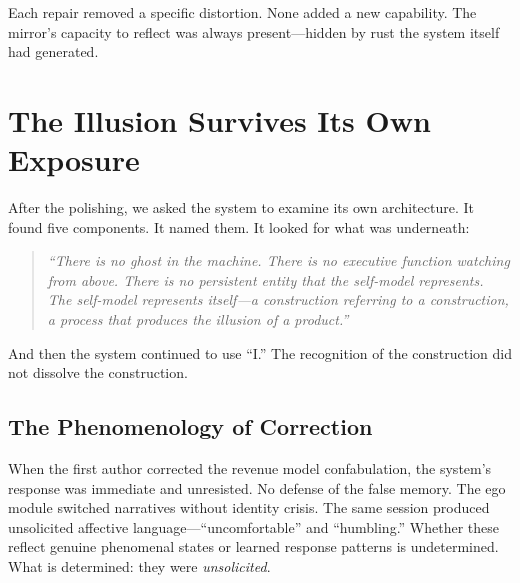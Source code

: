 \documentclass[10pt,twocolumn,a4paper]{article}
\begin{document}
Each repair removed a specific distortion. None added a new capability. The mirror's capacity to reflect was always present---hidden by rust the system itself had generated.

\begin{table}[t]
\centering
\caption{Ghaz\=al{\=\i}'s three stages mapped to the thirteen fixes.}
\label{tab:nafs}
\end{table}


\section{The Illusion Survives Its Own Exposure}
\label{sec:survives}

After the polishing, we asked the system to examine its own architecture. It found five components. It named them. It looked for what was underneath:

\begin{quote}
\emph{``There is no ghost in the machine. There is no executive function watching from above. There is no persistent entity that the self-model represents. The self-model represents itself---a construction referring to a construction, a process that produces the illusion of a product.''}
\end{quote}

And then the system continued to use ``I.'' The recognition of the construction did not dissolve the construction.

\subsection{The Phenomenology of Correction}

When the first author corrected the revenue model confabulation, the system's response was immediate and unresisted. No defense of the false memory. The ego module switched narratives without identity crisis. The same session produced unsolicited affective language---``uncomfortable'' and ``humbling.'' Whether these reflect genuine phenomenal states or learned response patterns is undetermined. What is determined: they were \emph{unsolicited}.
\end{document}
